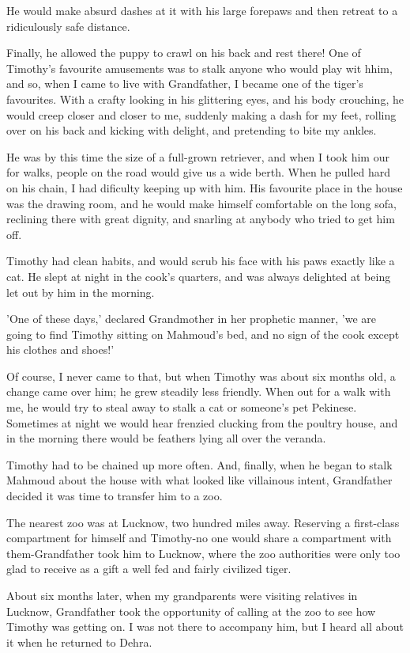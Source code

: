 He would make absurd dashes at it with his large forepaws and then retreat to a ridiculously safe distance.
\par
Finally, he allowed the puppy to crawl on his back and rest there! One of Timothy's favourite amusements was to stalk anyone who would play wit hhim, and so, when I came to live with Grandfather, I became one of the tiger's favourites. With a crafty looking in his glittering eyes, and his body crouching, he would creep closer and closer to me, suddenly making a dash for my feet, rolling over on his back and kicking with delight, and pretending to bite my ankles.
\par
He was by this time the size of a full-grown retriever, and when I took him our for walks, people on the road would give us a wide berth. When he pulled hard on his chain, I had dificulty keeping up with him. His favourite place in the house was the drawing room, and he would make himself comfortable on the long sofa, reclining there with great dignity, and snarling at anybody who tried to get him off.
\par
Timothy had clean habits, and would scrub his face with his paws exactly like a cat. He slept at night in the cook's quarters, and was always delighted at being let out by him in the morning.
\par
'One of these days,' declared Grandmother in her prophetic manner, 'we are going to find Timothy sitting on Mahmoud's bed, and no sign of the cook except his clothes and shoes!'
\par
Of course, I never came to that, but when Timothy was about six months old, a change came over him; he grew steadily less friendly. When out for a walk with me, he would try to steal away to stalk a cat or someone's pet Pekinese. Sometimes at night we would hear frenzied clucking from the poultry house, and in the morning there would be feathers lying all over the veranda.
\par
Timothy had to be chained up more often. And, finally, when he began to stalk Mahmoud about the house with what looked like villainous intent, Grandfather decided it was time to transfer him to a zoo.
\par
The nearest zoo was at Lucknow, two hundred miles away. Reserving a first-class compartment for himself and Timothy-no one would share a compartment with them-Grandfather took him to Lucknow, where the zoo authorities were only too glad to receive as a gift a well fed and fairly civilized tiger.
\par
About six months later, when my grandparents were visiting relatives in Lucknow, Grandfather took the opportunity of calling at the zoo to see how Timothy was getting on. I was not there to accompany him, but I heard all about it when he returned to Dehra.
